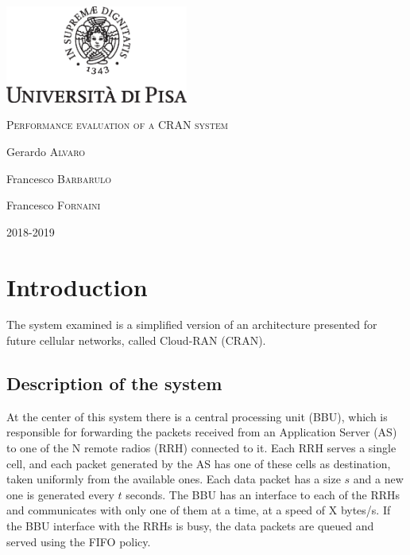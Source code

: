 \documentclass[11pt,a4paper,oneside, openright]{article}
\begin{document}
{
  \begin{titlepage}
  	\centering
  	\includegraphics[width=6cm]{images/unipi.eps}\par
  	\vspace{1.5cm}
  	{\huge\textsc{Performance evaluation of a CRAN system}\par}
  	\vspace{2cm}
  	Gerardo \textsc{Alvaro}\par
  	Francesco \textsc{Barbarulo}\par
    Francesco \textsc{Fornaini}

  	\vfill

  	{\large 2018-2019\par}
  \end{titlepage}
}


\tableofcontents

\newpage

\section{Introduction}
\label{sec:introduction}

The system examined is a simplified version of an architecture presented for future cellular networks, called Cloud-RAN (CRAN).

\subsection{Description of the system}
 At the center of this system there is a central processing unit (BBU), which is responsible for forwarding the packets received from an Application Server (AS) to one of the N remote radios (RRH) connected to it. Each RRH serves a single cell, and each packet generated by the AS has one of these cells as destination, taken uniformly from the available ones. Each data packet has a size $s$ and a new one is generated every $t$ seconds. The BBU has an interface to each of the RRHs and communicates with only one of them at a time, at a speed of X bytes/s. If the BBU interface with the RRHs is busy, the data packets are queued and served using the FIFO policy.
\end{document}
